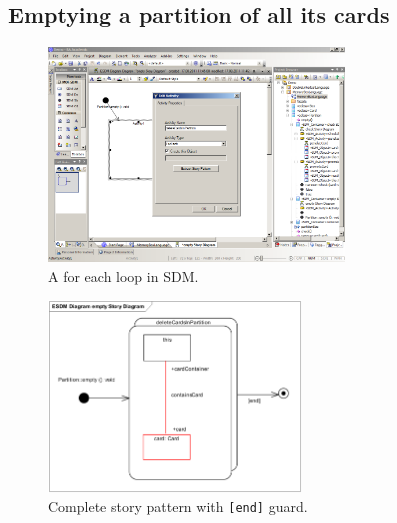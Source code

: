 \subsection{Emptying a partition of all its cards}
\begin{figure}[htp]
\begin{center}
  \includegraphics[width=0.7\textwidth]{pics/sdmBilder/empty/sdm42RAW}
  \caption{A for each loop in SDM.}  
  \label{fig:sdm_foreach}
\end{center}
\end{figure}

\begin{figure}[htp]
\begin{center}
  \includegraphics[width=0.6\textwidth]{pics/sdmBilder/empty/sdm47}
  \caption{Complete story pattern with \texttt{[end]} guard.}  
  \label{fig:sdm_end}
\end{center}
\end{figure}

\clearpage 